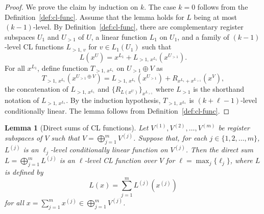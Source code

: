 \documentclass[11pt]{article}
\newtheorem{lemma}[theorem]{Lemma}
\theoremstyle{definition}
\begin{document}
\begin{proof}
  We prove the claim by induction on $k$.
  The case $k = 0$ follows from the Definition~\ref{def:cl-func}.
  Assume that the lemma holds for $L$ being at most $(k-1)$-level.
  By Definition~\ref{def:cl-func}, there are complementary register subspaces
  $U_1$ and $U_{>1}$ of $U$, a linear function $L_1$ on $U_1$, and a family of
  $(k-1)$-level CL functions $L_{>1,\, v}$ for $v \in L_1(U_1)$ such that
  \begin{equation*}
    L(x^U) = x^{L_1} + L_{>1,\, x^{L_1}}(x^{U_{>1}}).
  \end{equation*}
  For all $x^{L_1}$, define function $T_{>1,\, x^{L_1}}$ on $U_{>1} \oplus V$ as
  \begin{equation*}
    T_{>1,\, x^{L_1}}(x^{U_{>1} \oplus V}) = L_{>1,\, x^{L_1}}(x^{U_{>1}}) +
    R_{x^{L_1} + x^{L_{>1}}}(x^V),
  \end{equation*}
  the concatenation of $L_{>1,\, x^{L_1}}$ and $\{ R_{L(x^U)} \}_{x^{L_{>1}}}$
  where $L_{>1}$ is the shorthand notation of $L_{>1,\, x^{L_1}}$.
  By the induction hypothesis, $T_{>1,\, x^{L_1}}$ is $(k+\ell-1)$-level
  conditionally linear.
  The lemma follows from Definition~\ref{def:cl-func}.
\end{proof}
\begin{lemma}[Direct sums of CL functions]
  \label{lem:cl-func-prod}
  Let $V^{(1)}, V^{(2)}, \ldots, V^{(m)}$ be register subspaces of $V$ such that
  $V = \bigoplus_{j=1}^m V^{(j)}$. Suppose that, for each $j\in\{1, 2, \ldots,
  m\}$, $L^{(j)}$ is an $\ell_j$-level conditionally linear function on
  $V^{(j)}$. Then the direct sum $L = \bigoplus_{j=1}^m L^{(j)}$ is an
  $\ell$-level CL function over $V$ for $\ell = \max_j \{\ell_j\}$, where $L$ is
  defined by
  \begin{equation*}
    L(x) = \sum_{j=1}^m  L^{(j)}(x^{(j)})
  \end{equation*}
  for all $x = \sum_{j=1}^m x^{(j)} \in \bigoplus_{j=1}^m V^{(j)}$.
\end{lemma}
\end{document}
